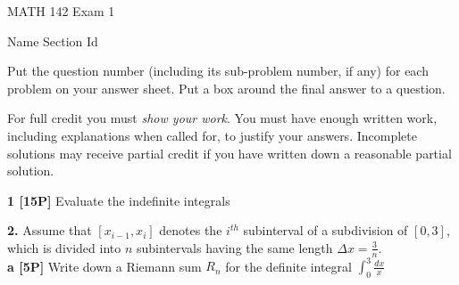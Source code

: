 \documentclass[12pt]{article}
\begin{document}
\begin{bf}
\hspace{.75in}
\begin{large}{MATH 142 \quad Exam 1} %
\end{large}
\hspace{1in}
\parbox{2.5in}{Name \newline Section \qquad Id}
\end{bf}

\vspace{0.2in}

Put the question number (including its sub-problem number, if any) for each 
problem on your answer sheet. 
Put a box around the final answer to a question.

\vspace*{.02in}
For full credit you must \emph{show your work}. You must have enough
written work, including explanations when called for, to justify your
answers. Incomplete solutions may receive partial credit if you have
written down a reasonable partial solution. %
                 

\vspace{.25in}

{\bf 1 [15P]} Evaluate the indefinite integrals
\begin{enumerate}
\item[a.] \; ${\displaystyle \int \frac{dx}{x-\pi }$
\item[b.] \; ${\displaystyle \int \frac{x}{1+ x^2}\, dx \,  }$
\item[c.] \; ${\displaystyle \int \tan x dx} $
\end{enumerate}

\newpage

{\bf 2.} Assume that ${\displaystyle [x_{i-1},x_i]}$ denotes the
$i^{th}$ subinterval of a subdivision of $[0,3]$,
which is divided into $n$ subintervals having the same length ${\displaystyle
\Delta x = \frac{3}{n}}$. \\
{\bf a [5P]} Write down a Riemann sum $R_n$ for the definite integral 
$\int_0^3 \frac{dx}{x} $
\end{document}
